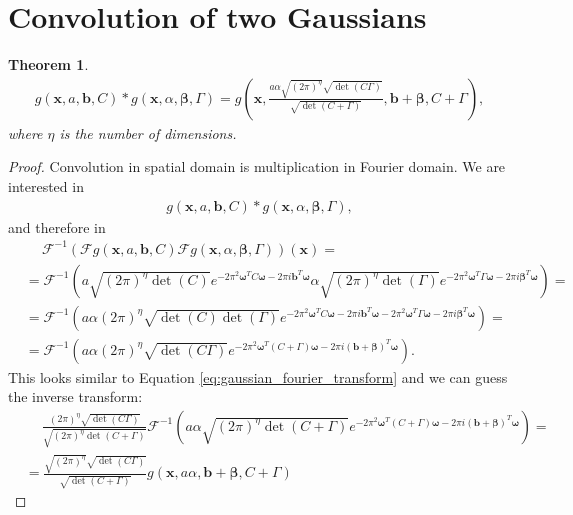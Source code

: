 \documentclass{paper}
\newtheorem{theorem}{Theorem}
\newcommand{\F}{\ensuremath{\mathcal{F}}}
\newcommand{\vr}[1]{\ensuremath{\boldsymbol{#1}}}
\newcommand{\betavec}[0]{\ensuremath{\vr{\beta{}}}}
\newcommand{\omegavec}[0]{\ensuremath{\vr{\omega{}}}}
\newcommand{\bvec}[0]{\ensuremath{\vr{b}}}
\newcommand{\xvec}[0]{\ensuremath{\vr{x}}}
\begin{document}
\section{Convolution of two Gaussians}
\label{sec:convolution}
\begin{theorem}
	\begin{align}
		g(\xvec, a, \bvec, C) \ast g(\xvec, \alpha, \vr{\beta}, \Gamma) = 
		g\left(\xvec, \frac{a \alpha \sqrt{(2 \pi)^\eta} \sqrt{\det(C\Gamma)}}{\sqrt{\det(C+\Gamma)}}, \bvec + \betavec, C + \Gamma\right),
	\end{align}
	where $\eta$ is the number of dimensions.
\end{theorem}
\begin{proof}
Convolution in spatial domain is multiplication in Fourier domain.
We are interested in
\begin{align*}
	g(\xvec, a, \bvec, C) \ast g(\xvec, \alpha, \vr{\beta}, \Gamma),
\end{align*}
and therefore in
\begin{align*}
	&\ \quad \F^{-1}(\F g(\xvec, a, \bvec, C) \F g(\xvec, \alpha, \vr{\beta}, \Gamma))(\xvec) = \nonumber \\
	&= \F^{-1}\left(a \sqrt{(2 \pi)^\eta \det(C)}      e^{-2 \pi^2 \omegavec^T C \omegavec      - 2\pi i \bvec^T \omegavec}
	         \alpha \sqrt{(2 \pi)^\eta \det(\Gamma)} e^{-2 \pi^2 \omegavec^T \Gamma \omegavec - 2\pi i \betavec^T \omegavec}\right) = \nonumber \\
	&= \F^{-1}\left(a \alpha (2 \pi)^\eta \sqrt{\det(C) \det(\Gamma)}
			        e^{-2 \pi^2 \omegavec^T C \omegavec - 2\pi i \bvec^T \omegavec - 2 \pi^2 \omegavec^T \Gamma \omegavec - 2\pi i \betavec^T \omegavec}\right) = \nonumber \\
	\label{eq:gaussian_convolution_before_inverse_transform}
	&= \F^{-1}\left(a \alpha (2 \pi)^\eta \sqrt{\det(C\Gamma)}
                    e^{-2 \pi^2 \omegavec^T (C + \Gamma) \omegavec - 2\pi i (\bvec + \betavec)^T \omegavec}\right).
\end{align*}
This looks similar to Equation \ref{eq:gaussian_fourier_transform} and we can guess the inverse transform:
\begin{align*}
	&\ \quad \frac{(2 \pi)^\eta \sqrt{\det(C\Gamma)}}{\sqrt{(2\pi)^\eta \det(C+\Gamma)}}
	        \F^{-1}\left(
	                     a \alpha \sqrt{(2\pi)^\eta \det(C+\Gamma)}
	                     e^{-2 \pi^2 \omegavec^T (C + \Gamma) \omegavec - 2\pi i (\bvec + \betavec)^T \omegavec}\right) = \\
	&= \frac{\sqrt{(2 \pi)^\eta} \sqrt{\det(C\Gamma)}}{\sqrt{\det(C+\Gamma)}}
	   g(\xvec, a \alpha, \bvec + \betavec, C + \Gamma)
\end{align*}
\end{proof}
\end{document}
